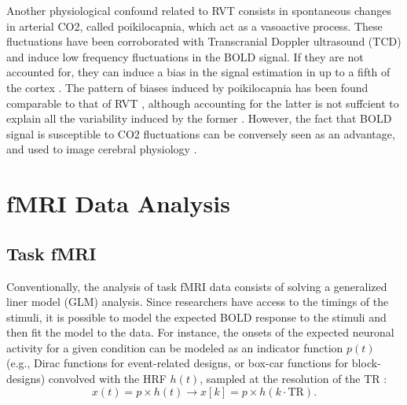 Another physiological confound related to RVT consists in spontaneous changes in
arterial CO2, called poikilocapnia, which act as a vasoactive process. These
fluctuations have been corroborated with Transcranial Doppler ultrasound
(TCD) and induce low frequency fluctuations in the BOLD signal. If
they are not accounted for, they can induce a bias in the signal estimation in
up to a fifth of the cortex \citep{Wise2004Restingfluctuationsarterial}. The
pattern of biases induced by poikilocapnia has been found comparable to that of
RVT \citep{Chang2009Relationshiprespirationend}, although accounting for the
latter is not suffcient to explain all the variability induced by the former
\citep{Golestani2015Mappingendtidal}. However, the fact that BOLD signal is
susceptible to CO2 fluctuations can be conversely seen as an advantage, and used
to image cerebral physiology
\citep{Pinto2021CerebrovascularReactivityMapping,Zvolanek2023Comparingendtidal,Moia2021ICAbaseddenoising}.

\section{fMRI Data Analysis}

\subsection{Task fMRI}

Conventionally, the analysis of task fMRI data consists of solving a generalized
liner model (GLM) analysis. Since researchers have access to the timings of the
stimuli, it is possible to model the expected BOLD response to the stimuli and
then fit the model to the data. For instance, the onsets of the expected
neuronal activity for a given condition can be modeled as an indicator function
$p(t)$ (e.g., Dirac functions for event-related designs, or box-car functions
for block-designs) convolved with the HRF $h(t)$, sampled at the resolution of
the TR
\citep{Friston2008DEMvariationaltreatment,Friston1998EventRelatedfMRI,Boynton1996LinearSystemsAnalysis,Cohen1997ParametricAnalysisfMRI}:
\begin{equation}
    x(t) = p \times h(t) \rightarrow x\left[k\right] = p \times h(k \cdot \text{TR}).
\end{equation}

